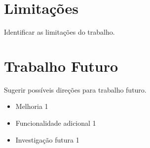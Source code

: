 \section{Limitações}
\label{sec:limitacoes}

Identificar as limitações do trabalho.

\section{Trabalho Futuro}
\label{sec:trabalho_futuro}

Sugerir possíveis direções para trabalho futuro.

\begin{itemize}
    \item Melhoria 1
    \item Funcionalidade adicional 1
    \item Investigação futura 1
\end{itemize}

